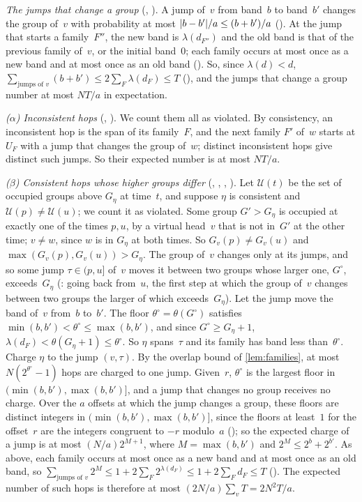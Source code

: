 \begin{outline}
\emph{The jumps that change a group} (, ). A jump of~$v$ from band~$b$ to
band~$b'$ changes the group of~$v$ with probability at most $\lvert b-b' \rvert/a\le(b+b')/a$ (). At the jump that starts a
family~$F''$, the new band is $\lambda(d_{F''})$ and the old band is that of the previous family of~$v$, or the initial
band~$0$; each family occurs at most once as a new band and at most once as an old band (). So,
since $\lambda(d)<d$, $\sum_{\text{jumps of }v}(b+b')\le2\sum_F\lambda(d_F)\le T$ (), and
the jumps that change a group number at most $NT/a$ in expectation.

\emph{($\alpha$) Inconsistent hops} (, ). We count them all as violated. By
consistency, an inconsistent hop is the span of its family~$F$, and the next family $F'$ of~$w$ starts at $U_F$ with a jump
that changes the group of~$w$; distinct inconsistent hops give distinct such jumps. So their expected number is at most
$NT/a$.

\emph{($\beta$) Consistent hops whose higher groups differ} (, ,
, ). Let $\mathcal U(t)$ be the set of occupied groups above
$G_\eta$ at time~$t$, and suppose $\eta$ is consistent and $\mathcal U(p)\ne\mathcal U(u)$; we count it as violated. Some group
$G'>G_\eta$ is occupied at exactly one of the times $p,u$, by a virtual head~$v$ that is not in~$G'$ at the other time;
$v\ne w$, since $w$ is in $G_\eta$ at both times. So $G_v(p)\ne G_v(u)$ and $\max(G_v(p),G_v(u))>G_\eta$. The group of~$v$
changes only at its jumps, and so some jump $\tau\in(p,u]$ of~$v$ moves it between two groups whose larger one, $G^\circ$,
exceeds~$G_\eta$ (: going back from~$u$, the first step at which the group of~$v$ changes between two
groups the larger of which exceeds~$G_\eta$). Let the jump move the band of~$v$ from~$b$ to~$b'$. The floor
$\theta^\circ=\theta(G^\circ)$ satisfies $\min(b,b')<\theta^\circ\le\max(b,b')$, and since
$G^\circ\ge G_\eta+1$, $\lambda(d_F)<\theta(G_\eta+1)\le\theta^\circ$. So $\eta$ spans~$\tau$ and its family has band
less than~$\theta^\circ$. Charge $\eta$ to the jump $(v,\tau)$. By the overlap bound of \cref{lem:families}, at most
$N(2^{\theta^\circ}-1)$ hops are charged to one jump. Given~$r$, $\theta^\circ$ is the largest floor in
$(\min(b,b'),\max(b,b')]$, and a jump that changes no group receives no charge. Over the $a$ offsets at which the jump
changes a group, these floors are distinct integers in $(\min(b,b'),\max(b,b')]$, since the floors at least~$1$ for the
offset~$r$ are the integers congruent to $-r$ modulo~$a$ (); so the expected charge of a jump is at
most $(N/a)2^{M+1}$, where $M=\max(b,b')$ and $2^M\le2^b+2^{b'}$. As above, each family occurs at most once as a new band
and at most once as an old band, so $\sum_{\text{jumps of }v}2^M\le1+2\sum_F2^{\lambda(d_F)}\le1+2\sum_Fd_F\le T$
(). The expected number of such hops is therefore at most $(2N/a)\sum_vT=2N^2T/a$.


\end{outline}
